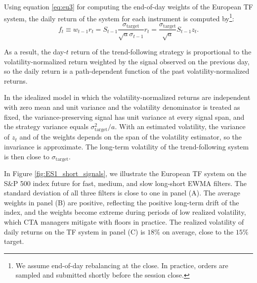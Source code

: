 \documentclass[hidelinks]{siamonline250211}
\begin{document}
\begin{corollary} Using equation \eqref{eq:eu3} for computing the end-of-day weights of the European TF system, the daily return of the system for each instrument is computed by\footnote{We assume end-of-day rebalancing at the close. In practice, orders are sampled and submitted shortly before the session close.}:
	\begin{equation} \label{eq:ret} 
		f_{t}  \equiv w_{t-1} r_{t} =  S_{t-1}  \frac{\sigma_{\mathrm{target}}}{\sqrt{a}\sigma_{t-1}}r_{t}= \frac{\sigma_{\mathrm{target}}}{\sqrt{a}}  S_{t-1} z_{t}.
	\end{equation}
	
\end{corollary}

As a result, the day-$t$ return of the trend-following strategy is proportional to the volatility-normalized return weighted by the signal observed on the previous day, so the daily return is a path-dependent function of the past volatility-normalized returns.




In the idealized model in which the volatility-normalized returns are independent with zero mean and unit variance and the volatility denominator is treated as fixed, the variance-preserving signal has unit variance at every signal span, and the strategy variance equals $\sigma^{2}_{\mathrm{target}}/a$. With an estimated volatility, the variance of $z_{t}$ and of the weights depends on the span of the volatility estimator, so the invariance is approximate. The long-term volatility of the trend-following system is then close to $\sigma_{\mathrm{target}}$.



In Figure \ref{fig:ES1_short_signals}, we illustrate the European TF system on the S\&P 500 index future for fast, medium, and slow long-short EWMA filters. The standard deviation of all three filters is close to one in panel (A). The average weights in panel (B) are positive, reflecting the positive long-term drift of the index, and the weights become extreme during periods of low realized volatility, which CTA managers mitigate with floors in practice. The realized volatility of daily returns on the TF system in panel (C) is $18\%$ on average, close to the $15\%$ target.
\end{document}
